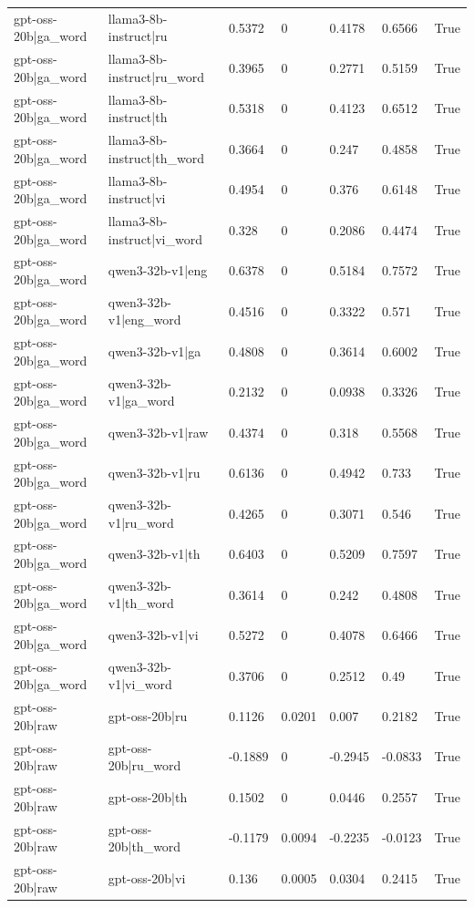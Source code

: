 \begin{table}
\begin{tabular}{llllllr}
gpt-oss-20b|ga_word & llama3-8b-instruct|ru & 0.5372 & 0 & 0.4178 & 0.6566 & True \\
gpt-oss-20b|ga_word & llama3-8b-instruct|ru_word & 0.3965 & 0 & 0.2771 & 0.5159 & True \\
gpt-oss-20b|ga_word & llama3-8b-instruct|th & 0.5318 & 0 & 0.4123 & 0.6512 & True \\
gpt-oss-20b|ga_word & llama3-8b-instruct|th_word & 0.3664 & 0 & 0.247 & 0.4858 & True \\
gpt-oss-20b|ga_word & llama3-8b-instruct|vi & 0.4954 & 0 & 0.376 & 0.6148 & True \\
gpt-oss-20b|ga_word & llama3-8b-instruct|vi_word & 0.328 & 0 & 0.2086 & 0.4474 & True \\
gpt-oss-20b|ga_word & qwen3-32b-v1|eng & 0.6378 & 0 & 0.5184 & 0.7572 & True \\
gpt-oss-20b|ga_word & qwen3-32b-v1|eng_word & 0.4516 & 0 & 0.3322 & 0.571 & True \\
gpt-oss-20b|ga_word & qwen3-32b-v1|ga & 0.4808 & 0 & 0.3614 & 0.6002 & True \\
gpt-oss-20b|ga_word & qwen3-32b-v1|ga_word & 0.2132 & 0 & 0.0938 & 0.3326 & True \\
gpt-oss-20b|ga_word & qwen3-32b-v1|raw & 0.4374 & 0 & 0.318 & 0.5568 & True \\
gpt-oss-20b|ga_word & qwen3-32b-v1|ru & 0.6136 & 0 & 0.4942 & 0.733 & True \\
gpt-oss-20b|ga_word & qwen3-32b-v1|ru_word & 0.4265 & 0 & 0.3071 & 0.546 & True \\
gpt-oss-20b|ga_word & qwen3-32b-v1|th & 0.6403 & 0 & 0.5209 & 0.7597 & True \\
gpt-oss-20b|ga_word & qwen3-32b-v1|th_word & 0.3614 & 0 & 0.242 & 0.4808 & True \\
gpt-oss-20b|ga_word & qwen3-32b-v1|vi & 0.5272 & 0 & 0.4078 & 0.6466 & True \\
gpt-oss-20b|ga_word & qwen3-32b-v1|vi_word & 0.3706 & 0 & 0.2512 & 0.49 & True \\
gpt-oss-20b|raw & gpt-oss-20b|ru & 0.1126 & 0.0201 & 0.007 & 0.2182 & True \\
gpt-oss-20b|raw & gpt-oss-20b|ru_word & -0.1889 & 0 & -0.2945 & -0.0833 & True \\
gpt-oss-20b|raw & gpt-oss-20b|th & 0.1502 & 0 & 0.0446 & 0.2557 & True \\
gpt-oss-20b|raw & gpt-oss-20b|th_word & -0.1179 & 0.0094 & -0.2235 & -0.0123 & True \\
gpt-oss-20b|raw & gpt-oss-20b|vi & 0.136 & 0.0005 & 0.0304 & 0.2415 & True \\

\end{tabular}
\end{table}

